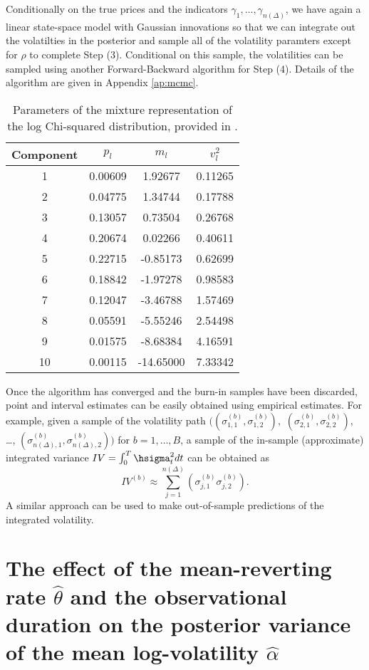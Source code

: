 Conditionally on the true prices and the indicators $\gamma_{1}, \ldots, \gamma_{n(\Delta)}$, we have again a linear state-space model with Gaussian innovations so that we can integrate out the volatilties in the posterior and sample all of the volatility paramters except for $\rho$ to complete Step (3). Conditional on this sample, the volatilities can be sampled using another Forward-Backward algorithm for Step (4). Details of the algorithm are given in Appendix \ref{ap:mcmc}.
\begin{table}
\begin{center}
\begin{tabular}{c|ccc}
Component   &   $p_l$   &   $m_l$   &   $v^2_l$  \\ \hline
1 & 0.00609 & 1.92677 & 0.11265 \\
2 & 0.04775 & 1.34744 & 0.17788 \\
3 & 0.13057 & 0.73504 & 0.26768 \\
4 & 0.20674 & 0.02266 & 0.40611 \\
5 & 0.22715 & -0.85173 & 0.62699 \\
6 & 0.18842 &-1.97278 & 0.98583 \\
7 & 0.12047 & -3.46788  & 1.57469 \\
8 & 0.05591 & -5.55246 & 2.54498 \\
9 & 0.01575 & -8.68384 & 4.16591 \\
10 & 0.00115 & -14.65000 & 7.33342
\end{tabular}
\caption{Parameters of the mixture representation of the log Chi-squared distribution, provided in \cite{omori2007stochastic}.}\label{ta:mixture_parameters}
\end{center}
\end{table}

Once the algorithm has converged and the burn-in samples have been discarded, point and interval estimates can be easily obtained using empirical estimates.  For example, given a sample of the volatility path $( (\sigma^{(b)}_{1,1},\sigma^{(b)}_{1,2}),$ $(\sigma^{(b)}_{2,1},\sigma^{(b)}_{2,2}),$ \ldots,  $(\sigma^{(b)}_{n(\Delta),1}, \sigma^{(b)}_{n(\Delta),2}))$ for $b=1, \ldots, B$, a sample of the in-sample (approximate) integrated variance $IV = \int_0^T \hsigma^2_t dt$ can be obtained as
$$
IV^{(b)} \approx \sum_{j=1}^{n(\Delta)} \left( \sigma^{(b)}_{j,1}\sigma^{(b)}_{j,2} \right)   .
$$
A similar approach can be used to make out-of-sample predictions of the integrated volatility.


\section{The effect of the mean-reverting rate $\hat{\theta}$ and the observational duration on the posterior variance of the mean log-volatility $\hat{\alpha}$}\label{effect-mean-reverting-rate}

